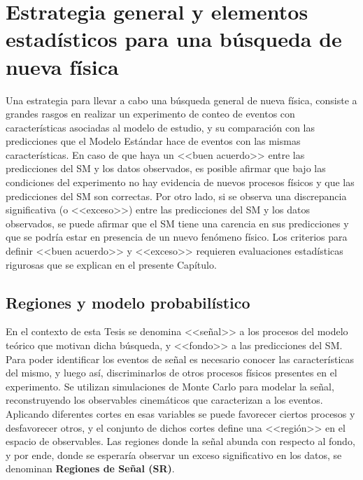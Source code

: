 \chapter{Estrategia general y elementos estadísticos para una búsqueda de nueva física}\label{cap:statistical}


Una estrategia para llevar a cabo una búsqueda general de nueva física, consiste a grandes rasgos en realizar un experimento de conteo de eventos con características asociadas al modelo de estudio, y su comparación con las predicciones que el Modelo Estándar hace de eventos con las mismas características. En caso de que haya un <<buen acuerdo>> entre las predicciones del SM y los datos observados, es posible afirmar que bajo las condiciones del experimento no hay evidencia de nuevos procesos físicos y que las predicciones del SM son correctas. 
Por otro lado, si se observa una discrepancia significativa (o <<exceso>>) entre las predicciones del SM y
los datos observados, se puede afirmar que el SM tiene una carencia en sus predicciones y que se podría estar en presencia de un nuevo fenómeno físico. Los criterios para definir <<buen acuerdo>> y <<exceso>> requieren evaluaciones estadísticas rigurosas que se explican en el presente Capítulo. 

\section{Regiones y modelo probabilístico}

En el contexto de esta Tesis se denomina <<señal>> a los procesos del modelo teórico que motivan dicha búsqueda, y <<fondo>> a las predicciones del SM. Para poder identificar los eventos de señal es necesario conocer las características del mismo, y luego así, discriminarlos de otros procesos físicos presentes en el experimento. Se utilizan simulaciones de Monte Carlo para modelar la señal, reconstruyendo los observables cinemáticos que caracterizan a los eventos. Aplicando diferentes cortes en esas variables se puede favorecer ciertos procesos y desfavorecer otros, y el conjunto de dichos cortes define una <<región>> en el espacio de observables. Las regiones donde la señal abunda con respecto al fondo, y por ende, donde se esperaría observar un exceso significativo en los datos, se denominan \textbf{Regiones de Señal (SR)}.

